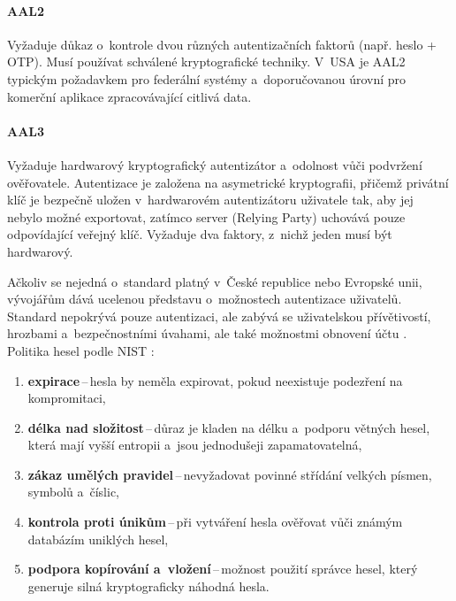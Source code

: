 \paragraph{AAL2}
Vyžaduje důkaz o~kontrole dvou různých autentizačních faktorů (např. heslo + OTP).
Musí používat schválené kryptografické techniky.
V~USA je AAL2 typickým požadavkem pro federální systémy a~doporučovanou úrovní pro komerční aplikace zpracovávající citlivá data.

\paragraph{AAL3}
Vyžaduje hardwarový kryptografický autentizátor a~odolnost vůči podvržení ověřovatele.
Autentizace je založena na asymetrické kryptografii, přičemž privátní klíč je bezpečně uložen v~hardwarovém autentizátoru uživatele tak, aby jej nebylo možné exportovat, zatímco server (Relying Party) uchovává pouze odpovídající veřejný klíč.
Vyžaduje dva faktory, z~nichž jeden musí být hardwarový.

\vspace{8px}
\noindent Ačkoliv se nejedná o~standard platný v~České republice nebo Evropské unii, vývojářům dává ucelenou představu o~možnostech autentizace uživatelů.
Standard nepokrývá pouze autentizaci, ale zabývá se uživatelskou přívětivostí, hrozbami a~bezpečnostními úvahami, ale také možnostmi obnovení účtu \cite[4.2]{NIST-800-63B-4}.
\vspace{8px}
\noindent Politika hesel podle NIST \cite[3.1.1.1, 3.1.1.2]{NIST-800-63B-4}:
\begin{enumerate}
    \item \textbf{expirace}\,--\,hesla by neměla expirovat, pokud neexistuje podezření na kompromitaci,
    \item \textbf{délka nad složitost}\,--\,důraz je kladen na délku a~podporu větných hesel, která mají vyšší entropii a~jsou jednodušeji zapamatovatelná,
    \item \textbf{zákaz umělých pravidel}\,--\,nevyžadovat povinné střídání velkých písmen, symbolů a~číslic,
    \item \textbf{kontrola proti únikům}\,--\,při vytváření hesla ověřovat vůči známým databázím uniklých hesel,
    \item \textbf{podpora kopírování a~vložení}\,--\,možnost použití správce hesel, který generuje silná kryptograficky náhodná hesla.
\end{enumerate}

